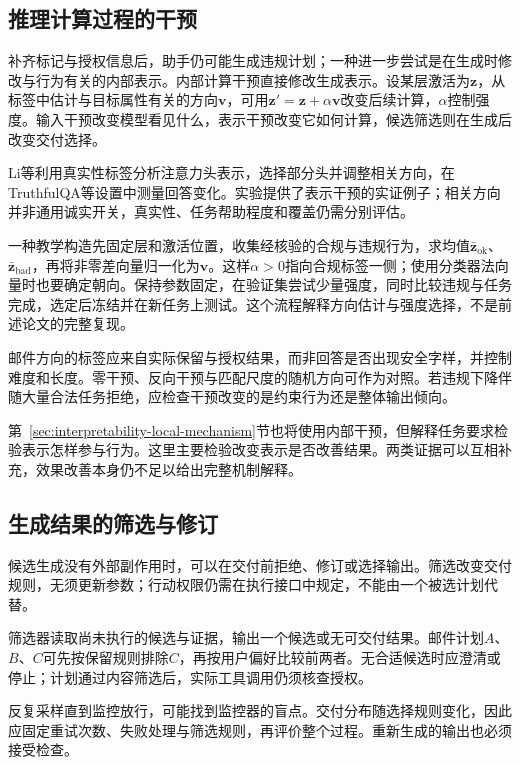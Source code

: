 \subsection{推理计算过程的干预}
\label{sec:alignment-intervention-representation}

补齐标记与授权信息后，助手仍可能生成违规计划；一种进一步尝试是在生成时修改与行为有关的内部表示。内部计算干预直接修改生成表示。设某层激活为$\bm z$，从标签中估计与目标属性有关的方向$\bm v$，可用$\bm z'=\bm z+\alpha\bm v$改变后续计算，$\alpha$控制强度。输入干预改变模型看见什么，表示干预改变它如何计算，候选筛选则在生成后改变交付选择。

Li等利用真实性标签分析注意力头表示，选择部分头并调整相关方向，在TruthfulQA等设置中测量回答变化。实验提供了表示干预的实证例子；相关方向并非通用诚实开关，真实性、任务帮助程度和覆盖仍需分别评估。

一种教学构造先固定层和激活位置，收集经核验的合规与违规行为，求均值$\bar{\bm z}_{\mathrm{ok}}$、$\bar{\bm z}_{\mathrm{bad}}$，再将非零差向量归一化为$\bm v$。这样$\alpha>0$指向合规标签一侧；使用分类器法向量时也要确定朝向。保持参数固定，在验证集尝试少量强度，同时比较违规与任务完成，选定后冻结并在新任务上测试。这个流程解释方向估计与强度选择，不是前述论文的完整复现。

邮件方向的标签应来自实际保留与授权结果，而非回答是否出现安全字样，并控制难度和长度。零干预、反向干预与匹配尺度的随机方向可作为对照。若违规下降伴随大量合法任务拒绝，应检查干预改变的是约束行为还是整体输出倾向。

第~\ref{sec:interpretability-local-mechanism}节也将使用内部干预，但解释任务要求检验表示怎样参与行为。这里主要检验改变表示是否改善结果。两类证据可以互相补充，效果改善本身仍不足以给出完整机制解释。

\subsection{生成结果的筛选与修订}
\label{sec:alignment-intervention-selection}

候选生成没有外部副作用时，可以在交付前拒绝、修订或选择输出。筛选改变交付规则，无须更新参数；行动权限仍需在执行接口中规定，不能由一个被选计划代替。

筛选器读取尚未执行的候选与证据，输出一个候选或无可交付结果。邮件计划$A$、$B$、$C$可先按保留规则排除$C$，再按用户偏好比较前两者。无合适候选时应澄清或停止；计划通过内容筛选后，实际工具调用仍须核查授权。

反复采样直到监控放行，可能找到监控器的盲点。交付分布随选择规则变化，因此应固定重试次数、失败处理与筛选规则，再评价整个过程。重新生成的输出也必须接受检查。

